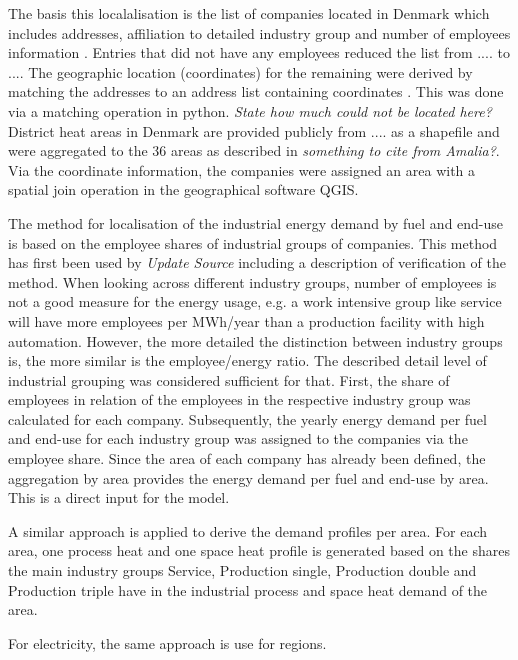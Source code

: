 \documentclass[review]{elsarticle}
\begin{document}
The basis this localalisation is the list of companies located in Denmark which includes addresses, affiliation to detailed industry group and number of employees information \cite{virk2017}. Entries that did not have any employees reduced the list from .... to .... The geographic location (coordinates) for the remaining were derived by matching the addresses to an address list containing coordinates \cite{}. This was done via a matching operation in python. \textit{State how much could not be located here?} District heat areas in Denmark are provided publicly from .... as a shapefile \cite{kortforsyningen2017} and were aggregated to the 36 areas as described in \cite{Petrovic2014} \textit{something to cite from Amalia?}. Via the coordinate information, the companies were assigned an area with a spatial join operation in the geographical software QGIS.

The method for localisation of the industrial energy demand by fuel and end-use is based on the employee shares of industrial groups of companies. This method has first been used by \cite{Buehler2017} \textit{Update Source} including a description of verification of the method. When looking across different industry groups, number of employees is not a good measure for the energy usage, e.g. a work intensive group like service will have more employees per MWh/year than a production facility with high automation. However, the more detailed the distinction between industry groups is, the more similar is the employee/energy ratio. The described detail level of industrial grouping was considered sufficient for that. First, the share of employees in relation of the employees in the respective industry group was calculated for each company. Subsequently, the yearly energy demand per fuel and end-use for each industry group was assigned to the companies via the employee share. Since the area of each company has already been defined, the aggregation by area provides the energy demand per fuel and end-use by area. This is a direct input for the model.

A similar approach is applied to derive the demand profiles per area. For each area, one process heat and one space heat profile is generated based on the shares the main industry groups Service, Production single, Production double and Production triple have in the industrial process and space heat demand of the area.

For electricity, the same approach is use for regions. 

\end{document}

